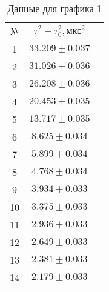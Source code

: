 \documentclass[a4paper]{article}
\begin{document}
    \begin{table}[h]
    \centering
        \begin{tabular}{|c|c|c|}
        \cline{1-2}
        № &  $\tau^2 - \tau_0^2, \text{мкс}^2$\\ \cline{1-2}
        1 &  $33.209 \pm 0.037$\\ \cline{1-2}
        2 &  $31.026 \pm 0.036$ \\ \cline{1-2}
        3 &  $26.208 \pm 0.036$  \\ \cline{1-2}
        4 &  $20.453 \pm 0.035$  \\ \cline{1-2}
        5 &  $13.717 \pm 0.035$  \\ \cline{1-2}
        6 &  $8.625 \pm 0.034$  \\ \cline{1-2}
        7 &  $5.899 \pm 0.034$  \\ \cline{1-2}
        8 &  $4.768 \pm 0.034$  \\ \cline{1-2}
        9 &  $3.934 \pm 0.033$  \\ \cline{1-2}
        10 & $3.375 \pm 0.033$  \\ \cline{1-2}
        11 &  $2.936 \pm 0.033$ \\ \cline{1-2}
        12 &  $2.649 \pm 0.033$ \\ \cline{1-2}
        13 &  $2.381 \pm 0.033$ \\ \cline{1-2}
        14 &  $2.179 \pm 0.033$ \\ \cline{1-2}
        
        \end{tabular}
        \caption{Данные для графика 1}
        \label{tab:my_label}
    \end{table}
\end{document}

